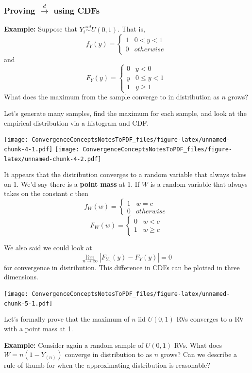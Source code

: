 \documentclass[
]{article}
\begin{document}
\hypertarget{proving-stackreldrightarrow-using-cdfs}{%
\subsubsection{\texorpdfstring{Proving \(\stackrel{d}\rightarrow\) using
CDFs}{Proving \textbackslash stackrel\{d\}\textbackslash rightarrow using CDFs}}\label{proving-stackreldrightarrow-using-cdfs}}

\textbf{Example:} Suppose that \(Y_i\stackrel{iid}\sim U(0,1)\). That
is, \[f_Y(y) = \begin{cases}1 & 0<y<1\\0 & otherwise\end{cases}\] and
\[F_Y(y) = \begin{cases} 0 & y < 0\\ y & 0\leq y < 1 \\ 1 & y\geq 1\end{cases}\]
What does the maximum from the sample converge to in distribution as
\(n\) grows?

Let's generate many samples, find the maximum for each sample, and look
at the empirical distribution via a histogram and CDF.

\texttt{[image: ConvergenceConceptsNotesToPDF\_files/figure-latex/unnamed-chunk-4-1.pdf]}
\texttt{[image: ConvergenceConceptsNotesToPDF\_files/figure-latex/unnamed-chunk-4-2.pdf]}

It appears that the distribution converges to a random variable that
always takes on 1. We'd say there is a \textbf{point mass} at 1. If
\(W\) is a random variable that always takes on the constant \(c\) then
\[f_W(w) = \begin{cases} 1 & w = c\\ 0 & otherwise\end{cases}\]
\[F_W(w) = \begin{cases} 0 & w < c\\ 1 & w\geq c\end{cases}\]

We also said we could look at
\[\lim_{n \rightarrow \infty} |F_{Y_n}(y)-F_{Y}(y)|=0\] for convergence
in distribution. This difference in CDFs can be plotted in three
dimensions.

\texttt{[image: ConvergenceConceptsNotesToPDF\_files/figure-latex/unnamed-chunk-5-1.pdf]}

Let's formally prove that the maximum of \(n\) iid \(U(0,1)\) RVs
converges to a RV with a point mass at 1.

\textbf{Example:} Consider again a random sample of \(U(0,1)\) RVs. What
does \(W = n(1-Y_{(n)})\) converge in distribution to as \(n\) grows?
Can we describe a rule of thumb for when the approximating distribution
is reasonable?
\end{document}

